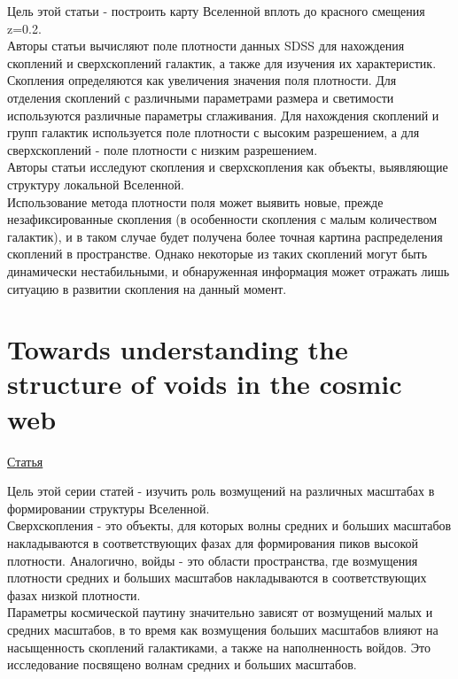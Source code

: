 \documentclass{article}
\begin{document}
Цель этой статьи - построить карту Вселенной вплоть до красного смещения z=0.2.\\

Авторы статьи вычисляют поле плотности данных SDSS для нахождения скоплений и сверхскоплений галактик,
а также для изучения их характеристик.\\

Скопления определяются как увеличения значения поля плотности. Для отделения скоплений с различными
параметрами размера и светимости используются различные параметры сглаживания. Для нахождения 
скоплений и групп галактик используется поле плотности с высоким разрешением, а для сверхскоплений 
- поле плотности с низким разрешением.\\ 

Авторы статьи исследуют скопления и сверхскопления как объекты, выявляющие структуру локальной 
Вселенной.\\

Использование метода плотности поля может выявить новые, прежде незафиксированные скопления (в 
особенности скопления с малым количеством галактик), и в таком случае будет получена более точная 
картина распределения скоплений в пространстве. Однако некоторые из таких скоплений могут быть 
динамически нестабильными, и обнаруженная информация может отражать лишь ситуацию в развитии 
скопления на данный момент.\\

\section{Towards understanding the structure of voids in the cosmic web}
\hyperlink{https://www.aanda.org/articles/aa/pdf/2011/10/aa17248-11.pdf}{Статья}

Цель этой серии статей - изучить роль возмущений на различных масштабах в формировании структуры 
Вселенной.\\

Сверхскопления - это объекты, для которых волны средних и больших масштабов накладываются в 
соответствующих фазах для формирования пиков высокой плотности. Аналогично, войды - это области 
пространства, где возмущения плотности средних и больших масштабов накладываются в соответствующих 
фазах низкой плотности.\\

Параметры космической паутину значительно зависят от возмущений малых и средних масштабов, в то время 
как возмущения больших масштабов влияют на насыщенность скоплений галактиками, а также на наполненность
войдов. Это исследование посвящено волнам средних и больших масштабов.\\
\end{document}
